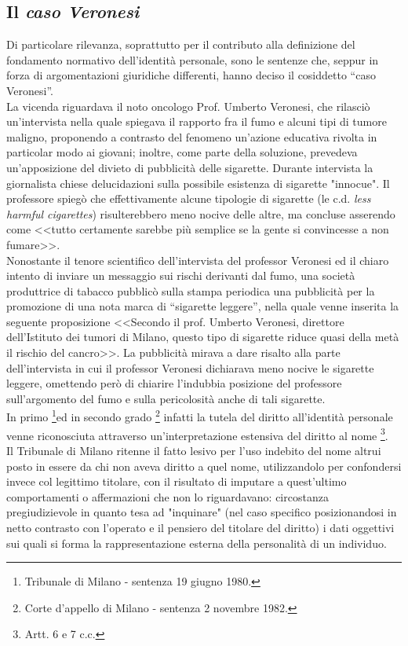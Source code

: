 \subsection{Il \textit{caso Veronesi}}
Di particolare rilevanza, soprattutto per il contributo alla definizione del fondamento normativo dell’identità personale, sono le sentenze che, seppur in forza di argomentazioni giuridiche differenti, hanno deciso il cosiddetto “caso Veronesi”.
\\La vicenda riguardava il noto oncologo Prof. Umberto Veronesi, che  rilasciò un’intervista nella quale spiegava il rapporto fra il fumo e alcuni tipi di tumore maligno, proponendo a contrasto del fenomeno un'azione educativa rivolta in particolar modo ai giovani; inoltre, come parte della soluzione, prevedeva un'apposizione del divieto di pubblicità delle sigarette. Durante intervista la giornalista chiese delucidazioni sulla possibile esistenza di sigarette "innocue". Il professore spiegò che effettivamente alcune tipologie di sigarette (le c.d.\textit{ less harmful cigarettes}) risulterebbero meno nocive delle altre, ma concluse asserendo come <<tutto certamente sarebbe più semplice se la gente si convincesse a non fumare>>.\\Nonostante il tenore scientifico dell’intervista del professor Veronesi ed il chiaro intento di inviare un messaggio sui rischi derivanti dal fumo, una società produttrice di tabacco pubblicò sulla stampa periodica una pubblicità per la promozione di una nota marca di “sigarette leggere”, nella quale venne inserita la seguente proposizione <<Secondo il prof. Umberto Veronesi, direttore dell’Istituto dei tumori di Milano, questo tipo di sigarette riduce quasi della metà il rischio del cancro>>. La pubblicità mirava a dare risalto alla parte dell’intervista in cui il professor Veronesi dichiarava meno nocive le sigarette leggere, omettendo però di chiarire l'indubbia posizione del professore sull'argomento del fumo e sulla pericolosità anche di tali sigarette.
\\In primo \footnote{Tribunale di Milano - sentenza 19 giugno 1980.}ed in secondo grado \footnote{Corte d’appello di Milano - sentenza 2 novembre 1982.} infatti la tutela del diritto all’identità personale venne riconosciuta attraverso un’interpretazione estensiva del diritto al nome \footnote{Artt. 6 e 7 c.c.}.
\\Il Tribunale di Milano ritenne il fatto lesivo per l’uso indebito del nome altrui posto in essere da chi non aveva diritto a quel nome, utilizzandolo per confondersi invece col legittimo titolare, con il risultato di imputare a quest’ultimo comportamenti o affermazioni che non lo riguardavano: circostanza pregiudizievole in quanto tesa ad "inquinare" (nel caso specifico posizionandosi in netto contrasto con l'operato e il pensiero del titolare del diritto) i dati oggettivi sui quali si forma la rappresentazione esterna della personalità di un individuo. 
